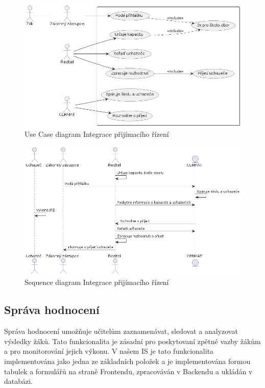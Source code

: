\documentclass[FM,Proj]{tulthesis}
\begin{document}
\begin{figure}[H]
    \includegraphics[width=\textwidth-28pt]{uc-integrace-prijimaciho-rizeni.png}
    \caption{Use Case diagram Integrace přijímacího řízení}
    \label{fig:uc-integrace-prijimaciho-rizeni}
\end{figure}

\begin{figure}[H]
    \includegraphics[width=\textwidth-28pt]{seq-integrace-prijimaciho-rizeni.png}
    \caption{Sequence diagram Integrace přijímacího řízení}
    \label{fig:seq-integrace-prijimaciho-rizeni}
\end{figure}

\subsection*{Správa hodnocení}
Správa hodnocení umožňuje učitelům zaznamenávat, sledovat a analyzovat výsledky žáků. Tato
funkcionalita je zásadní pro poskytovaní zpětné vazby žákům a pro monitorování jejich výkonu.
V našem IS je tato funkcionalita implementována jako jedna ze základních položek a je 
implementována formou tabulek a formulářů na straně Frontendu, zpracováván v Backendu a
ukládán v databázi.
\end{document}
